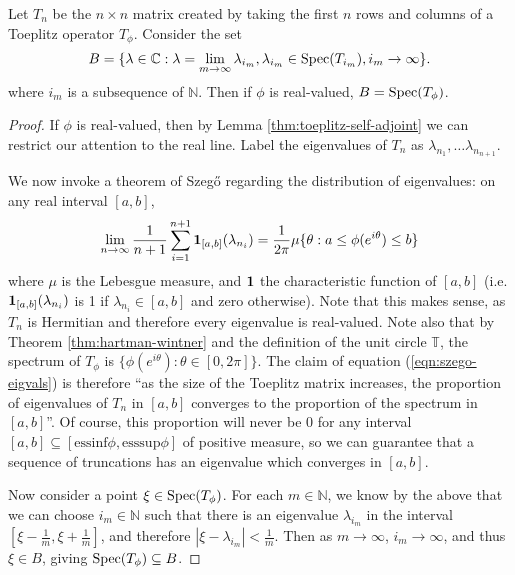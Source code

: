 \documentclass[../main.tex]{subfiles}
\begin{document}
\begin{theorem}
Let $T_n$ be the $n \times n$ matrix created by taking the first $n$ rows and
columns of a Toeplitz operator $T_\phi$. Consider the set $$B =
\{\lambda \in \mathbb{C} : \lambda = \lim_{m \rightarrow \infty}
\lambda_{i_m}, \lambda_{i_m} \in \mathrm{Spec}(T_{i_m}), i_m \rightarrow \infty
\}.$$
where $i_m$ is a subsequence of $\mathbb{N}$. Then if $\phi$ is real-valued, $B = \mathrm{Spec}(T_\phi)$.
\end{theorem}
\begin{proof}
If $\phi$ is real-valued, then by Lemma \ref{thm:toeplitz-self-adjoint} we can
restrict our attention to the real line. Label the eigenvalues of $T_n$
as $\lambda_{n_1}, \hdots \lambda_{n_{n+1}}$. 
 
We now invoke a theorem of Szeg\H{o} \cite{grenander2001toeplitz} regarding the
distribution of eigenvalues: on any real interval $[a, b]$,
\begin{equation}
\label{eqn:szego-eigvals}
\lim_{n \rightarrow \infty} \frac{1}{n+1} \sum_{i=1}^{n+1} \mathbf{1}_{[a, b]}(\lambda_{n_i}) 
= \frac{1}{2 \pi} \mu\{\theta : a \leq \phi(e^{i \theta}) \leq b\}
\end{equation}
where $\mu$ is the Lebesgue measure, and $\mathbf{1}$ the characteristic function of $[a,b]$ 
(i.e. $\mathbf{1}_{[a, b]}(\lambda_{n_i})$ is 1 if $\lambda_{n_i} \in [a, b]$ and zero
otherwise). Note that this makes sense, as $T_n$ is Hermitian and
therefore every eigenvalue is real-valued. Note also that by Theorem
\ref{thm:hartman-wintner} and the definition of the unit circle
$\mathbb{T}$,
the spectrum of $T_\phi$ is $\{\phi(e^{i \theta}): \theta \in [0, 2\pi]\}$. The
claim of equation (\ref{eqn:szego-eigvals}) is therefore ``as the size
of the Toeplitz matrix increases, the proportion of eigenvalues of $T_n$
in $[a, b]$ converges to the proportion of the spectrum in $[a, b]$''. 
Of course, this proportion will never be 0 for any interval $[a, b] \subseteq
[\textrm{essinf}\phi, \textrm{esssup}\phi]$ of positive measure, so we
can guarantee that a sequence of truncations has an eigenvalue which
converges in $[a, b]$. 

Now consider a point $\xi \in \mathrm{Spec}(T_\phi)$. For each $m \in \mathbb{N}$, we
know by the above that we can choose $i_m \in \mathbb{N}$ such that
there is an eigenvalue $\lambda_{i_m}$ in the interval $[\xi -
\frac{1}{m}, \xi + \frac{1}{m}]$, and therefore $|\xi - \lambda_{i_m}| <
\frac{1}{m}$. Then as $m \rightarrow \infty$, $i_m \rightarrow \infty$,
and thus $\xi \in B$, giving $\mathrm{Spec}(T_\phi) \subseteq B$.


\end{proof}
\end{document}
